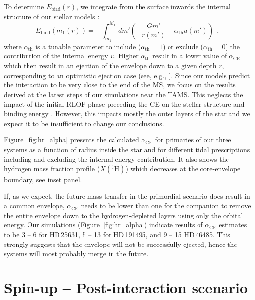\documentclass{aa}
\DeclareRobustCommand{\Figref}[1]{Figure~\ref{#1}}
\begin{document}
To determine $E_\mathrm{bind}(r)$, we integrate from the surface inwards the internal structure of our stellar models
  \citep[e.g.,][]{Han_1995, Dewi_2000, renzo:23}:
\begin{equation}
  \label{eq:BE}
E_\mathrm{bind}(m_1(r)) = - \int_{m_1}^{M_1}\,dm'\left( -\frac{G m'}{r(m')}+\alpha_\mathrm{th}u(m')\right) \ \ ,
\end{equation}
where $\alpha_\mathrm{th}$ is a tunable parameter to include
  ($\alpha_\mathrm{th}=1$) or exclude ($\alpha_\mathrm{th}=0$) the
  contribution of the internal energy $u$. Higher $\alpha_\mathrm{th}$
  result in a lower value of $\alpha_\mathrm{CE}$ which then result in an ejection of
  the envelope down to a given depth $r$,
  corresponding to an optimistic ejection case (see, e.g.,
  \citealt{klencki:21}). Since our models predict the interaction to
  be very close to the end of the MS, we focus on the results derived
at the latest steps of our simulations near the TAMS. This
  neglects the impact of the initial RLOF
  phase preceding the CE on the stellar structure and binding energy \citep[e.g.,][]{ivanova:2020, renzo:21gwce,
    blagorodnova:21}. However, this impacts mostly the outer layers of
the star and we expect it to be insufficient to change our
conclusions.

\Figref{fig:hr_alpha} presents the calculated $\alpha_\mathrm{CE}$ for
primaries of our three systems as a function of radius inside the star
and for different tidal prescriptions including and excluding the
  internal energy contribution. It
also shows the hydrogen mass fraction profile
($X(^{1}\mathrm{H})$) which decreases at the core-envelope boundary, see inset panel.

If, as we expect, the future mass transfer in the
  primordial scenario does result in a common envelope,
$\alpha_\mathrm{CE}$ needs to be lower than one for the
  companion to remove the entire envelope down to the
  hydrogen-depleted layers using only the orbital energy. Our simulations (\Figref{fig:hr_alpha}) indicate results of $\alpha_\mathrm{CE}$ estimates to be 3
-- 6 for HD\,25631, 5 -- 13 for HD\,191495, and 9 -- 15 HD\,46485.
This strongly suggests that the envelope will not be successfully ejected, hence the
systems will most probably merge in the future.

\section{Spin-up -- Post-interaction scenario}
\label{sec:post-interaction}
\end{document}
